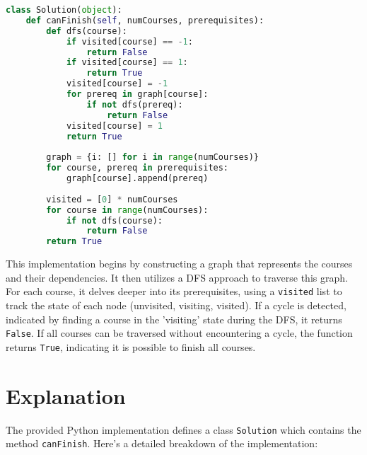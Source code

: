 \begin{fullwidth}
\begin{lstlisting}[language=Python]
class Solution(object):
    def canFinish(self, numCourses, prerequisites):
        def dfs(course):
            if visited[course] == -1:
                return False
            if visited[course] == 1:
                return True
            visited[course] = -1
            for prereq in graph[course]:
                if not dfs(prereq):
                    return False
            visited[course] = 1
            return True
        
        graph = {i: [] for i in range(numCourses)}
        for course, prereq in prerequisites:
            graph[course].append(prereq)
        
        visited = [0] * numCourses
        for course in range(numCourses):
            if not dfs(course):
                return False
        return True
\end{lstlisting}
\end{fullwidth}

This implementation begins by constructing a graph that represents the courses and their dependencies. It then utilizes a DFS approach to traverse this graph. For each course, it delves deeper into its prerequisites, using a \texttt{visited} list to track the state of each node (unvisited, visiting, visited). If a cycle is detected, indicated by finding a course in the 'visiting' state during the DFS, it returns \texttt{False}. If all courses can be traversed without encountering a cycle, the function returns \texttt{True}, indicating it is possible to finish all courses.

\section*{Explanation}

The provided Python implementation defines a class \texttt{Solution} which contains the method \texttt{canFinish}. Here's a detailed breakdown of the implementation:

